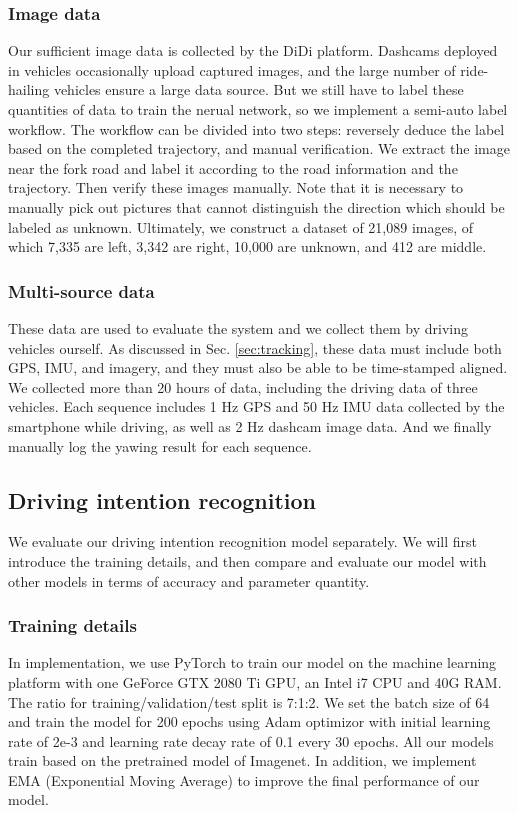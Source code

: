 \documentclass[journal]{IEEEtran}
\begin{document}
\subsubsection{Image data}
Our sufficient image data is collected by the DiDi platform. Dashcams deployed in vehicles occasionally upload captured images, and the large number of ride-hailing vehicles ensure a large data source. 
But we still have to label these quantities of data to train the nerual network, so we implement a semi-auto label workflow. The workflow can be divided into two steps: reversely deduce the label based on the completed trajectory, and manual verification. We extract the image near the fork road and label it according to the road information and the trajectory. Then verify these images manually. Note that it is necessary to manually pick out pictures that cannot distinguish the direction which should be labeled as unknown.
Ultimately, we construct a dataset of 21,089 images, of which 7,335 are left, 3,342 are right, 10,000 are unknown, and 412 are middle.
\subsubsection{Multi-source data}
These data are used to evaluate the system and we collect them by driving vehicles ourself. As discussed in Sec. \ref{sec:tracking}, these data must include both GPS, IMU, and imagery, and they must also be able to be time-stamped aligned. 
We collected more than 20 hours of data, including the driving data of three vehicles. Each sequence includes 1 Hz GPS and 50 Hz IMU data collected by the smartphone while driving, as well as 2 Hz dashcam image data. And we finally manually log the yawing result for each sequence.
\subsection{Driving intention recognition}
We evaluate our driving intention recognition model separately. 
We will first introduce the training details, and then compare and evaluate our model with other models in terms of accuracy and parameter quantity.
\subsubsection{Training details}
In implementation, we use PyTorch to train our model on the machine learning platform with one GeForce GTX 2080 Ti GPU, an Intel i7 CPU and 40G RAM. The ratio for training/validation/test split is 7:1:2. 
We set the batch size of 64 and train the model for 200 epochs using Adam optimizor with initial learning rate of 2e-3 and learning rate decay rate of 0.1 every 30 epochs. All our models train based on the pretrained model of Imagenet.
In addition, we implement EMA (Exponential Moving Average) to improve the final performance of our model. 
\end{document}
